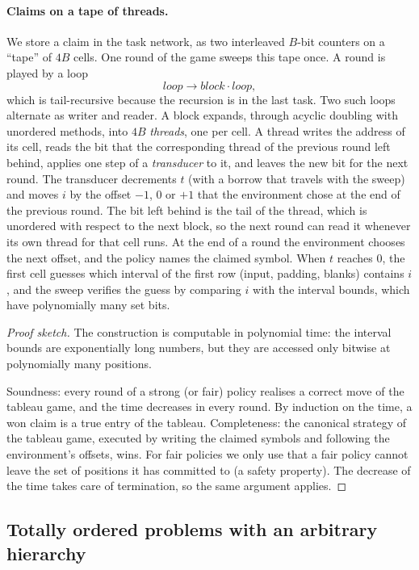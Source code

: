 \paragraph{Claims on a tape of threads.}
We store a claim in the task network, as two interleaved $B$-bit counters on a ``tape'' of
$4B$ cells. One round of the game sweeps this tape once. A round is played by a loop
\[
  \mathit{loop}\to\mathit{block}\cdot\mathit{loop},
\]
which is tail-recursive because the recursion is in the last task. Two such loops alternate as
writer and reader. A block expands, through acyclic doubling with unordered methods, into $4B$
\emph{threads}, one per cell. A thread writes the address of its cell, reads the bit that the
corresponding thread of the previous round left behind, applies one step of a \emph{transducer} to
it, and leaves the new bit for the next round. The transducer decrements $t$ (with a borrow that
travels with the sweep) and moves $i$ by the offset $-1$, $0$ or $+1$ that the environment chose
at the end of the previous round. The bit left behind is the tail of the thread, which is
unordered with respect to the next block, so the next round can read it whenever its own thread for
that cell runs. At the end of a round the environment chooses the next offset, and the policy names
the claimed symbol. When $t$ reaches $0$, the first cell guesses which interval of the first row
(input, padding, blanks) contains $i$, and the sweep verifies the guess by comparing $i$ with the
interval bounds, which have polynomially many set bits.

\begin{proof}[Proof sketch]
  The construction is computable in polynomial time: the interval bounds are exponentially long
  numbers, but they are accessed only bitwise at polynomially many positions.

  Soundness: every round of a strong (or fair) policy realises a correct move of the tableau game,
  and the time decreases in every round. By induction on the time, a won claim is a true entry
  of the tableau. Completeness: the canonical strategy of the tableau game, executed by writing the
  claimed symbols and following the environment's offsets, wins. For fair policies we only use
  that a fair policy cannot leave the set of positions it has committed to (a safety property). The
  decrease of the time takes care of termination, so the same argument applies.
\end{proof}

\subsection{Totally ordered problems with an arbitrary hierarchy}\label{sec:to-arb}

